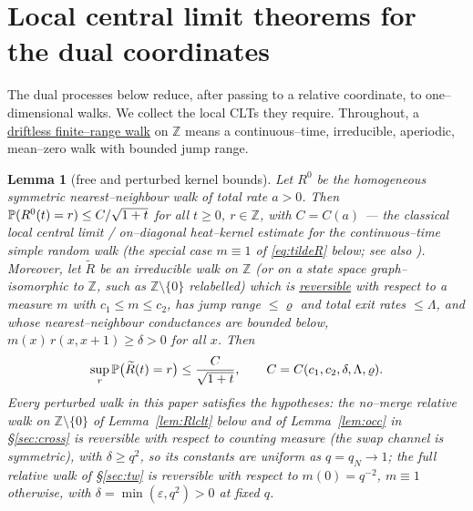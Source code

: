 \documentclass[11pt]{article}
\theoremstyle{plain}
\newtheorem{lemma}[theorem]{Lemma}
\theoremstyle{definition}
\theoremstyle{remark}
\newcommand{\Z}{\mathbb{Z}}\newcommand{\R}{\mathbb{R}}\newcommand{\N}{\mathbb{N}}
\newcommand{\eps}{\varepsilon}\newcommand{\Exp}{\mathrm{Exp}}
\begin{document}
\section{Local central limit theorems for the dual coordinates}\label{sec:lclt}

The dual processes below reduce, after passing to a relative coordinate, to
one--dimensional walks. We collect the local CLTs they require. Throughout, a
\underline{driftless finite--range walk} on $\Z$ means a continuous--time, irreducible,
aperiodic, mean--zero walk with bounded jump range.

\begin{lemma}[free and perturbed kernel bounds]\label{lem:free}
Let $R^0$ be the homogeneous symmetric nearest--neighbour walk of total rate $a>0$.
Then $\mathbb{P}(R^0(t)=r)\le C/\sqrt{1+t}$ for all $t\ge0$, $r\in\Z$, with $C=C(a)$ --- the
classical local central limit / on--diagonal heat--kernel estimate for the
continuous--time simple random walk (the special case $m\equiv1$ of \eqref{eq:tildeR}
below; see also \cite{LawlerLimic}).
Moreover, let $\widetilde R$ be an irreducible walk on $\Z$ (or on a state space
graph--isomorphic to $\Z$, such as $\Z\setminus\{0\}$ relabelled) which is
\underline{reversible} with respect to a measure $m$ with $c_1\le m\le c_2$, has jump range
$\le\varrho$ and total exit rates $\le\Lambda$, and whose nearest--neighbour
conductances are bounded below, $m(x)\,r(x,x+1)\ge\delta>0$ for all $x$. Then
\begin{equation}\label{eq:tildeR}
  \sup_{r}\mathbb{P}\big(\widetilde R(t)=r\big)\le \frac{C}{\sqrt{1+t}},
  \qquad C=C(c_1,c_2,\delta,\Lambda,\varrho).
\end{equation}
Every perturbed walk in this paper satisfies the hypotheses: the no--merge relative
walk on $\Z\setminus\{0\}$ of Lemma~\ref{lem:Rlclt} below and of
Lemma~\ref{lem:occ} in \S\ref{sec:cross} is reversible
with respect to counting measure (the swap channel is symmetric), with $\delta\ge
q^2$, so its constants are uniform as $q=q_N\to1$; the full relative walk of
\S\ref{sec:tw} is reversible with respect to $m(0)=q^{-2}$, $m\equiv1$ otherwise, with
$\delta=\min(\eps,q^2)>0$ at fixed $q$.
\end{lemma}
\end{document}
